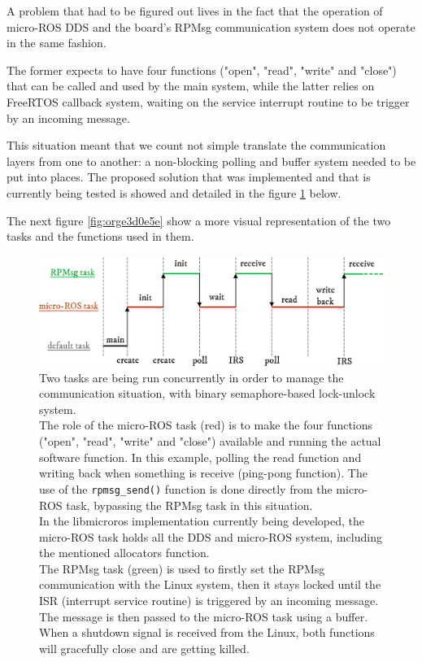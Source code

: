 \documentclass[10pt]{article}
\begin{document}
A problem that had to be figured out lives in the fact that the operation of micro-ROS DDS
and the board's RPMsg communication system does not operate in the same fashion.

The former expects to have four functions ("open", "read", "write" and "close") that can
be called and used by the main system, while the latter relies on FreeRTOS callback
system, waiting on the service interrupt routine to be trigger by an incoming message.

This situation meant that we count not simple translate the communication layers from one
to another: a non-blocking polling and buffer system needed to be put into places.
The proposed solution that was implemented and that is currently being tested
is showed and detailed in the figure \ref{fig:orgf825267} below.

The next figure \ref{fig:orge3d0e5e} show a more visual representation of the two tasks and the
functions used in them.

\begin{figure}[htbp]
\centering
\includegraphics[width=.9\textwidth]{./img/tasks.png}
\caption{\label{fig:orgf825267}Two tasks are being run concurrently in order to manage the communication situation, with binary semaphore-based lock-unlock system.\\[0pt]
 The role of the micro-ROS task (red) is to make the four functions ("open", "read", "write" and "close")  available and running the actual software function. In this example, polling the read function and writing back when something is receive (ping-pong function). The use of the \texttt{rpmsg\_send()} function is done directly from the micro-ROS task, bypassing the RPMsg task in this situation.\\[0pt]
 In the libmicroros implementation currently being developed, the micro-ROS task holds all the DDS and micro-ROS system, including the mentioned allocators function.\\[0pt]
 The RPMsg task (green) is used to firstly set the RPMsg communication with the Linux system, then it stays locked until the ISR (interrupt service routine) is triggered by an incoming message. The message is then passed to the micro-ROS task using a buffer.\\[0pt]
 When a shutdown signal is received from the Linux, both functions will gracefully close and are getting killed.}
\end{figure}
\end{document}
